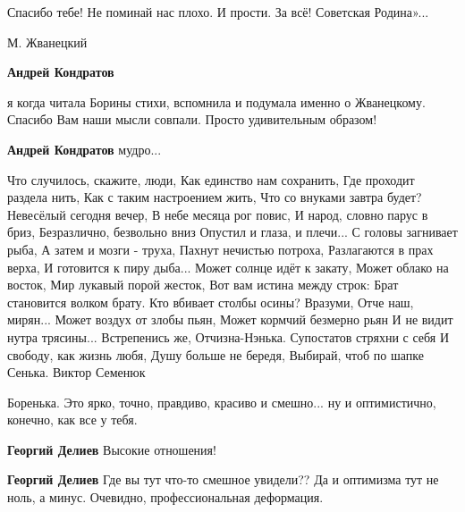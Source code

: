 \begin{itemize}
Спасибо тебе! Не поминай нас плохо. И прости. За всё! Советская Родина»...

М. Жванецкий

\begin{itemize} %
\textbf{Андрей Кондратов} 

я когда читала Борины стихи, вспомнила и подумала именно о Жванецкому. Спасибо
Вам наши мысли совпали. Просто удивительным образом!

\textbf{Андрей Кондратов} мудро...
\end{itemize} %


\begin{multicols}{2}
\obeycr
Что случилось, скажите, люди,
Как единство нам сохранить,
Где проходит раздела нить,
Как с таким настроением жить,
\smallskip
Что со внуками завтра будет?
Невесёлый сегодня вечер,
В небе месяца рог повис,
И народ, словно парус в бриз,
\smallskip
Безразлично, безвольно вниз
Опустил и глаза, и плечи...
С головы загнивает рыба,
А затем и мозги - труха,
\smallskip
Пахнут нечистью потроха,
Разлагаются в прах верха,
И готовится к пиру дыба...
Может солнце идёт к закату,
\smallskip
Может облако на восток,
Мир лукавый порой жесток,
Вот вам истина между строк:
Брат становится волком брату.
\smallskip
Кто вбивает столбы осины?
Вразуми, Отче наш, мирян...
Может воздух от злобы пьян,
Может кормчий безмерно рьян
\smallskip
И не видит нутра трясины...
Встрепенись же, Отчизна-Нэнька.
Супостатов стряхни с себя
И свободу, как жизнь любя,
\smallskip
Душу больше не бередя,
Выбирай, чтоб по шапке Сенька.
\smallskip
Виктор Семенюк
\restorecr
\end{multicols}



Боренька. Это ярко, точно, правдиво, красиво и смешно... ну и оптимистично,
конечно, как все у тебя.

\begin{itemize} %
\textbf{Георгий Делиев} Высокие отношения!

\textbf{Георгий Делиев} Где вы тут что-то смешное увидели?? Да и оптимизма тут не ноль, а минус. Очевидно, профессиональная деформация.
\end{itemize} %



\end{itemize}
